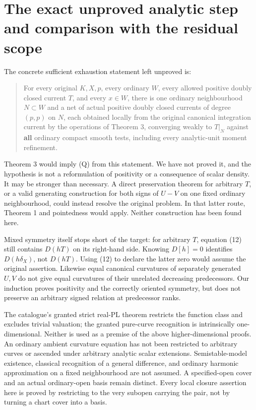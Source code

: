 \documentclass[
  11pt,
]{article}
\begin{document}
\section{The exact unproved analytic step and comparison with the
residual
scope}\label{the-exact-unproved-analytic-step-and-comparison-with-the-residual-scope}

The concrete sufficient exhaustion statement left unproved is:

\begin{quote}
For every original \(K,X,p\), every ordinary \(W\), every allowed
positive doubly closed current \(T\), and every \(x\in W\), there is one
ordinary neighbourhood \(N\subset W\) and a net of actual positive
doubly closed currents of degree \((p,p)\) on \(N\), each obtained
locally from the original canonical integration current by the
operations of Theorem 3, converging weakly to \(T|_N\) against
\textbf{all} ordinary compact smooth tests, including every
analytic-unit moment refinement.
\end{quote}

Theorem 3 would imply (Q) from this statement. We have not proved it,
and the hypothesis is not a reformulation of positivity or a consequence
of scalar density. It may be stronger than necessary. A direct
preservation theorem for arbitrary \(T\), or a valid generating
construction for both signs of \(U-V\) on one fixed ordinary
neighbourhood, could instead resolve the original problem. In that
latter route, Theorem 1 and pointedness would apply. Neither
construction has been found here.

Mixed symmetry itself stops short of the target: for arbitrary \(T\),
equation (12) still contains \(D(hT)\) on its right-hand side. Knowing
\(D[h]=0\) identifies \(D(h\delta_X)\), not \(D(hT)\). Using (12) to
declare the latter zero would assume the original assertion. Likewise
equal canonical curvatures of separately generated \(U,V\) do not give
equal curvatures of their unrelated decreasing predecessors. Our
induction proves positivity and the correctly oriented symmetry, but
does not preserve an arbitrary signed relation at predecessor ranks.

The catalogue's granted strict real-PL theorem restricts the function
class and excludes trivial valuation; the granted pure-curve recognition
is intrinsically one-dimensional. Neither is used as a premise of the
above higher-dimensional proofs. An ordinary ambient curvature equation
has not been restricted to arbitrary curves or ascended under arbitrary
analytic scalar extensions. Semistable-model existence, classical
recognition of a general difference, and ordinary harmonic approximation
on a fixed neighbourhood are not assumed. A specified-open cover and an
actual ordinary-open basis remain distinct. Every local closure
assertion here is proved by restricting to the very subopen carrying the
pair, not by turning a chart cover into a basis.
\end{document}
